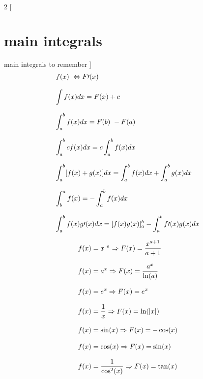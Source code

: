 \documentclass{article}
\begin{document}
\setlength{\columnsep}{1cm} 
\begin{multicols}{2}
    [
    \section{main integrals}
    main integrals to remember 
    ]
    \[
    \begin{array}{>{\displaystyle}l}  
        f( x) \ \Leftrightarrow F\prime ( x) \ \\
        \\
        \int f( x) dx=F( x) +c\\
        \\
        \int ^{b}_{a} f( x) dx=F( b) \ -F( a)\\
        \\
        \int ^{b}_{a} cf( x) dx=c\int ^{b}_{a} f( x) dx\\
        \\
        \int ^{b}_{a}[ f( x) +g( x)] dx=\int ^{b}_{a} f( x) dx+\int ^{b}_{a} g( x) dx\\
        \\
        \int ^{a}_{b} f( x) =-\int ^{b}_{a} f( x) dx\ \\
        \\
        \int ^{b}_{a} f( x) g\prime ( x) dx=[ f( x) g( x)]^{b}_{a} -\int ^{b}_{a} f\prime ( x) g( x) dx
    \end{array}
    \]

    \columnbreak
    \vspace*{\fill}
    \[
    \begin{array}{>{\displaystyle}l}  
        \displaystyle 
        f( x) =x^{\ a} \Rightarrow F( x) =\frac{x^{a+1}}{a+1}\\
        \\
        \displaystyle  
        f( x) =a^{x} \Rightarrow F( x) =\frac{a^{x}}{\ln( a)}\\
        \\
        f( x) =e^{x} \Rightarrow F( x) =e^{x}\\
        \\
        \displaystyle 
        f( x) =\frac{1}{x} \Rightarrow F( x) =\ln( |x|)\\
        \\
        f( x) =\sin( x) \Rightarrow F( x) =-\cos( x)\\
        \\
        f( x) =\cos( x) \Rightarrow F( x) =\sin( x)\\
        \\
        \displaystyle 
        f( x) =\frac{1}{\cos^{2}( x)} \Rightarrow F( x) =\tan( x)\\
    \end{array}
    \]
\end{multicols}
\end{document}
